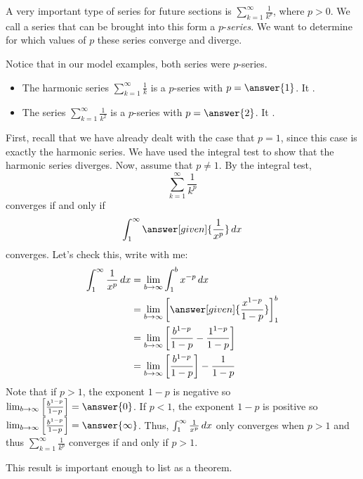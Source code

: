 \documentclass{ximera}
\begin{document}
A very important type of series for future sections is $\sum_{k=1}^\infty \frac{1}{k^p}$, where $p>0$.  We call a series that can be brought into this form a $p$-\emph{series}.  We want to determine for which values of $p$ these series converge and diverge.

Notice that in our model examples, both series were $p$-series.

\begin{itemize}
\item The harmonic series $\sum_{k=1}^{\infty} \frac{1}{k}$ is a $p$-series with $p = \answer{1}$.  It .
\item The series $\sum_{k=1}^{\infty} \frac{1}{k^2}$ is a $p$-series with $p = \answer{2}$. It .
\end{itemize}

 \begin{explanation}
    First, recall that we have already dealt with the case that $p = 1$, since
    this case is exactly the harmonic series.  We have used the integral test
    to show that the harmonic series diverges.
    Now, assume that $p \ne 1$.  By the integral test,
    \[
    \sum_{k=1}^\infty \frac{1}{k^p}
    \]
    converges if and only if
    \[
    \int_1^\infty \answer[given]{\frac{1}{x^p}} \d x
    \]
    converges. Let's check this, write with me:
    \begin{align*}
      \int_1^\infty \frac{1}{x^p} \d x &= \lim_{b\to\infty} \int_1^b x^{-p} \d x\\
      &= \lim_{b\to\infty} \eval{\answer[given]{\frac{x^{1-p}}{1-p}}}_1^b\\
      &= \lim_{b\to\infty} \left[ \frac{b^{1-p}}{1-p} - \frac{1^{1-p}}{1-p} \right] \\
      &= \lim_{b\to\infty} \left[\frac{b^{1-p}}{1-p}\right] - \frac{1}{1-p}
    \end{align*}
Note that if $p >1$, the exponent $1-p$ is negative so $ \lim_{b\to\infty} \left[\frac{b^{1-p}}{1-p}\right] = \answer{0}$.   If $p <1$, the exponent $1-p$ is positive so $ \lim_{b\to\infty} \left[\frac{b^{1-p}}{1-p}\right] = \answer{\infty}$.  Thus, $  \int_1^\infty \frac{1}{x^p} \mathop{}\!d x$  only converges when $p>1$ and thus  $\sum_{k=1}^\infty \frac{1}{k^p}$ converges if and only if $p>1$.
  \end{explanation}

This result is important enough to list as a theorem.
\end{document}
